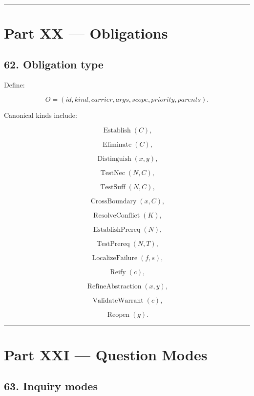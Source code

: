 \documentclass[
]{article}
\begin{document}
\begin{center}\rule{0.5\linewidth}{0.5pt}\end{center}

\section{Part XX --- Obligations}\label{part-xx-obligations}

\subsection{62. Obligation type}\label{obligation-type}

Define:

\[
\boxed{
O
=
(
id,
kind,
carrier,
args,
scope,
priority,
parents
).
}
\]

Canonical kinds include:

\[
\operatorname{Establish}(C),
\]

\[
\operatorname{Eliminate}(C),
\]

\[
\operatorname{Distinguish}(x,y),
\]

\[
\operatorname{TestNec}(N,C),
\]

\[
\operatorname{TestSuff}(N,C),
\]

\[
\operatorname{CrossBoundary}(x,C),
\]

\[
\operatorname{ResolveConflict}(K),
\]

\[
\operatorname{EstablishPrereq}(N),
\]

\[
\operatorname{TestPrereq}(N,T),
\]

\[
\operatorname{LocalizeFailure}(f,s),
\]

\[
\operatorname{Reify}(c),
\]

\[
\operatorname{RefineAbstraction}(x,y),
\]

\[
\operatorname{ValidateWarrant}(c),
\]

\[
\operatorname{Reopen}(g).
\]

\begin{center}\rule{0.5\linewidth}{0.5pt}\end{center}

\section{Part XXI --- Question Modes}\label{part-xxi-question-modes}

\subsection{63. Inquiry modes}\label{inquiry-modes}
\end{document}
